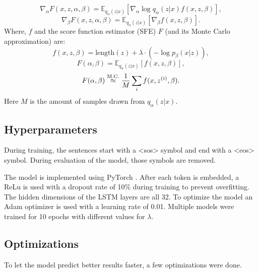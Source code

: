\begin{equation}
    \label{eq:gradient_alpha}
    \nabla_\alpha F(x, z, \alpha, \beta) = \mathbb{E}_{q_{\alpha}(z|x)} [\nabla_{\alpha} \log q_{\alpha}(z|x) f(x, z, \beta)],
\end{equation}
\begin{equation}
    \label{eq:gradient_beta}
    \nabla_\beta F(x, z, \alpha, \beta) = \mathbb{E}_{q_{\alpha}(z|x)} [\nabla_{\beta} f (x, z, \beta)].
\end{equation}
Where, $f$ and the score function estimator (SFE) $F$ (and its Monte Carlo approximation) are:
\begin{equation}
    \label{eq:f}
    f(x, z, \beta) = \text{length}(z) + \lambda \cdot (-\log p_{\beta}(x|z)),
\end{equation}
\begin{equation}
    \label{eq:F}
    F (\alpha, \beta) = \mathbb{E}_{q_{\alpha}(z|x)} [f(x, z, \beta)],
\end{equation}
\begin{equation}
    \label{eq:F_approx}
    F (\alpha, \beta) \stackrel{\text{M.C.}}{\approx} \frac{1}{M} \sum_i f (x, z^{(i)}, \beta).
\end{equation}
Here $M$ is the amount of samples drawn from $q_{\alpha}(z|x)$.

\subsection{Hyperparameters}
\label{sec:hyper}
During training, the sentences start with a <sos> symbol and end with a <eos> symbol.
During evaluation of the model, those symbols are removed.

The model is implemented using PyTorch .
After each token is embedded, a ReLu is used with a dropout rate of 10\% during training to prevent overfitting. 
The hidden dimensions of the LSTM layers are all 32. 
To optimize the model an Adam optimizer  is used with a learning rate of 0.01. 
Multiple models were trained for 10 epochs with different values for $\lambda$.

\subsection{Optimizations}
\label{sec:optimizations}
To let the model predict better results faster, a few optimizations were done.

